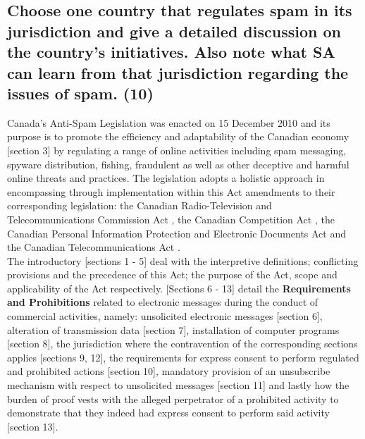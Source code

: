 \documentclass[11pt]{article}
\begin{document}
\subsection{Choose one country that regulates spam in its jurisdiction and give a detailed discussion on the country's initiatives. Also note what SA can learn from that jurisdiction regarding the issues of spam. (10)}
\label{sec:org35b11f4}

Canada's Anti-Spam Legislation \cite{ca10_anti_spam_act} was enacted on 15
December 2010 and its purpose is to promote the efficiency and adaptability of
the Canadian economy [section 3]\cite{ca10_anti_spam_act} by regulating a range of
online activities including spam messaging, spyware distribution, fishing,
fraudulent as well as other deceptive and harmful online threats and practices.
The legislation adopts a holistic approach in encompassing through
implementation within this Act amendments to their corresponding legislation:
the Canadian Radio-Television and Telecommunications Commission Act
\cite{ca85_radio_tv_telecomms_act}, the Canadian Competition Act
\cite{ca85_comp_act}, the Canadian Personal Information Protection and Electronic
Documents Act \cite{ca00_popi_act} and the Canadian Telecommunications Act
\cite{ca93_telecomms_act}.\\

The introductory [sections 1 - 5]\cite{ca10_anti_spam_act} deal with the
interpretive definitions; conflicting provisions and the precedence of this Act;
the purpose of the Act, scope and applicability of the Act respectively.
[Sections 6 - 13]\cite{ca10_anti_spam_act} detail the \textbf{Requirements and
Prohibitions} related to electronic messages during the conduct of commercial
activities, namely: unsolicited electronic messages [section
6]\cite{ca10_anti_spam_act}, alteration of transmission data [section
7]\cite{ca10_anti_spam_act}, installation of computer programs [section
8]\cite{ca10_anti_spam_act}, the jurisdiction where the contravention of the
corresponding sections applies [sections 9, 12]\cite{ca10_anti_spam_act}, the
requirements for express consent to perform regulated and prohibited actions
[section 10]\cite{ca10_anti_spam_act}, mandatory provision of an unsubscribe
mechanism with respect to unsolicited messages [section
11]\cite{ca10_anti_spam_act} and lastly how the burden of proof vests with the
alleged perpetrator of a prohibited activity to demonstrate that they indeed had
express consent to perform said activity [section
13]\cite{ca10_anti_spam_act}.\\
\end{document}
